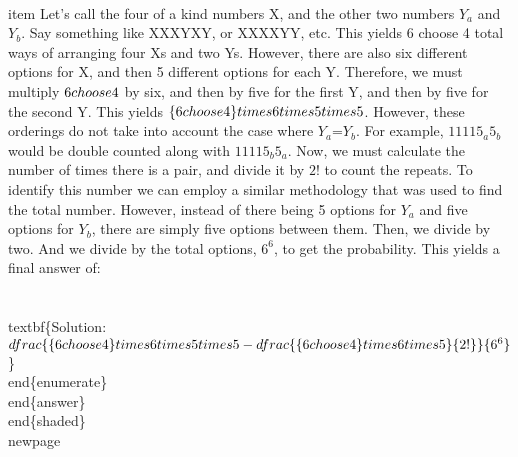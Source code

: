 {        \\item Let's call the four of a kind numbers X, and the other two numbers $Y_a$ and $Y_b$.  Say something like XXXYXY, or XXXXYY, etc. This yields 6 choose 4 total ways of arranging four Xs and two Ys. However, there are also six different options for X, and then 5 different options for each Y. Therefore, we must multiply $6 \\choose 4$ by six, and then by five for the first Y, and then by five for the second Y. This yields $\{6 \\choose 4\} \\times 6 \\times 5 \\times 5$. However, these orderings do not take into account the case where $Y_a$=$Y_b$. For example, $11115_a5_b$ would be double counted along with $11115_b5_a$. Now, we must calculate the number of times there is a pair, and divide it by $2!$ to count the repeats. To identify this number we can employ a similar methodology that was used to find the total number. However, instead of there being 5 options for $Y_a$ and five options for $Y_b$, there are simply five options between them. Then, we divide by two. And we divide by the total options, $6^6$, to get the probability. This yields a final answer of: \\\\ \\textbf\{Solution: $\\dfrac\{\{6 \\choose 4\} \\times 6 \\times 5 \\times 5 - \\dfrac\{\{6 \\choose 4\} \\times 6 \\times 5\}\{2!\}\}\{6^6\}$\}\
    \\end\{enumerate\}\
    \\end\{answer\}\
    \\end\{shaded\}\
    \\newpage\
    \
    }